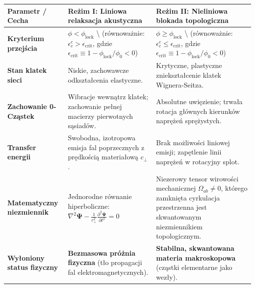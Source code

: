 \documentclass[
  polish,
  letterpaper,
  DIV=11,
  numbers=noendperiod,
  oneside]{scrartcl}
\newcounter{none} %
\begin{document}
{\def\LTcaptype{none} %
\begin{longtable}[]{@{}
  >{\raggedright\arraybackslash}p{}
  >{\raggedright\arraybackslash}p{}
  >{\raggedright\arraybackslash}p{}@{}}
\toprule\noalign{}
\begin{minipage}[b]{\linewidth}\raggedright
Parametr / Cecha
\end{minipage} & \begin{minipage}[b]{\linewidth}\raggedright
Reżim I: Liniowa relaksacja akustyczna
\end{minipage} & \begin{minipage}[b]{\linewidth}\raggedright
Reżim II: Nieliniowa blokada topologiczna
\end{minipage} \\
\midrule\noalign{}
\endhead
\bottomrule\noalign{}
\endlastfoot
\textbf{Kryterium przejścia} & \(\phi < \phi_{\text{lock}}\)
\textbackslash{} (równoważnie:
\(\epsilon^c_c > \epsilon_{\text{crit}}\), gdzie
\(\epsilon_{\text{crit}} \equiv 1 - \phi_\text{lock}/\phi_0 < 0\)) &
\(\phi \ge \phi_{\text{lock}}\) \textbackslash{} (równoważnie:
\(\epsilon^c_c \le \epsilon_{\text{crit}}\), gdzie
\(\epsilon_{\text{crit}} \equiv 1 - \phi_\text{lock}/\phi_0 < 0\)) \\
\textbf{Stan klatek sieci} & Niskie, zachowawcze odkształcenia
elastyczne. & Krytyczne, plastyczne zniekształcenie klatek
Wignera-Seitza. \\
\textbf{Zachowanie 0-Cząstek} & Wibracje wewnątrz klatek; zachowanie
pełnej macierzy pierwotnych sąsiadów. & Absolutne uwięzienie; trwała
rotacja głównych kierunków naprężeń sprężystych. \\
\textbf{Transfer energii} & Swobodna, izotropowa emisja fal poprzecznych
z prędkością materiałową \(c_{\perp}\). & Brak możliwości liniowej
emisji; zapętlenie linii naprężeń w rotacyjny splot. \\
\textbf{Matematyczny niezmiennik} & Jednorodne równanie hiperboliczne:
~\(\nabla^2 \mathbf{\Psi} - \frac{1}{c_{\perp}^2}\frac{\partial^2\mathbf{\Psi}}{\partial t^2} = 0\)
& Niezerowy tensor wirowości mechanicznej \(\Omega_{ab} \neq 0\),
którego zamknięta cyrkulacja przestrzenna jest skwantowanym
niezmiennikiem topologicznym. \\
\textbf{Wyłoniony status fizyczny} & \textbf{Bezmasowa próżnia fizyczna}
(tło propagacji fal elektromagnetycznych). & \textbf{Stabilna,
skwantowana materia makroskopowa} (cząstki elementarne jako wezły). \\
\end{longtable}
}
\end{document}
